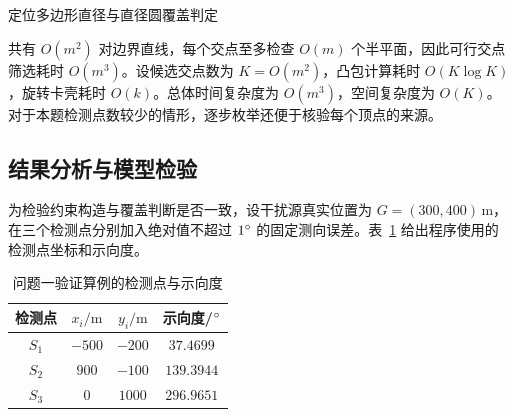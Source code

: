 \begin{modelalgorithm}{定位多边形直径与直径圆覆盖判定}
  \label{alg:p1}
  \begin{enumerate}[leftmargin=2.5em]
  \end{enumerate}
\end{modelalgorithm}

共有 \(O(m^2)\) 对边界直线，每个交点至多检查 \(O(m)\) 个半平面，因此可行交点筛选耗时 \(O(m^3)\)。设候选交点数为 \(K=O(m^2)\)，凸包计算耗时 \(O(K\log K)\)，旋转卡壳耗时 \(O(k)\)。总体时间复杂度为 \(O(m^3)\)，空间复杂度为 \(O(K)\)。对于本题检测点数较少的情形，逐步枚举还便于核验每个顶点的来源。

\subsection{结果分析与模型检验}

为检验约束构造与覆盖判断是否一致，设干扰源真实位置为 \(G=(300,400)\,\mathrm{m}\)，在三个检测点分别加入绝对值不超过 \(1^{\circ}\) 的固定测向误差。表~\ref{tab:p1-input} 给出程序使用的检测点坐标和示向度。

\begin{table}[H]
  \centering
  \caption{问题一验证算例的检测点与示向度}
  \label{tab:p1-input}
  \begin{tabular}{cccc}
    \toprule
    检测点 & \(x_i/\mathrm{m}\) & \(y_i/\mathrm{m}\) & 示向度/\(^{\circ}\) \\
    \midrule
    \(S_1\) & \(-500\) & \(-200\) & \(37.4699\) \\
    \(S_2\) & \(900\) & \(-100\) & \(139.3944\) \\
    \(S_3\) & \(0\) & \(1000\) & \(296.9651\) \\
    \bottomrule
  \end{tabular}
\end{table}


